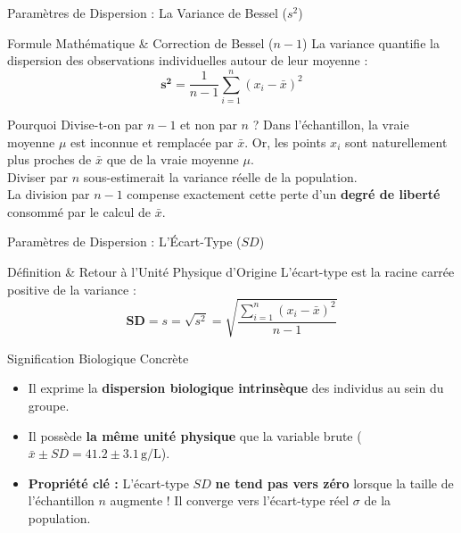 \documentclass[aspectratio=169,10pt]{beamer}
\begin{document}
\begin{frame}{Paramètres de Dispersion : La Variance de Bessel ($s^2$)}
  \begin{conceptbox}{Formule Mathématique \& Correction de Bessel ($n-1$)}
    La variance quantifie la dispersion des observations individuelles autour de leur moyenne :
    \begin{equation*}
      \mathbf{s^2} = \frac{1}{n - 1} \sum_{i=1}^n (x_i - \bar{x})^2
    \end{equation*}
  \end{conceptbox}
  \vspace{1.5mm}
  \begin{biobox}{Pourquoi Divise-t-on par $n-1$ et non par $n$ ?}
    Dans l'échantillon, la vraie moyenne $\mu$ est inconnue et remplacée par $\bar{x}$. Or, les points $x_i$ sont naturellement plus proches de $\bar{x}$ que de la vraie moyenne $\mu$.\\
    Diviser par $n$ sous-estimerait la variance réelle de la population.\\
    La division par $n-1$ compense exactement cette perte d'un \textbf{degré de liberté} consommé par le calcul de $\bar{x}$.
  \end{biobox}
\end{frame}

\begin{frame}{Paramètres de Dispersion : L'Écart-Type ($SD$)}
  \begin{conceptbox}{Définition \& Retour à l'Unité Physique d'Origine}
    L'écart-type est la racine carrée positive de la variance :
    \begin{equation*}
      \mathbf{SD} = s = \sqrt{s^2} = \sqrt{\frac{\sum_{i=1}^n (x_i - \bar{x})^2}{n - 1}}
    \end{equation*}
  \end{conceptbox}
  \vspace{1.5mm}
  \begin{biobox}{Signification Biologique Concrète}
    \begin{itemize}\setlength{\itemsep}{1.5pt}
      \item Il exprime la \textbf{dispersion biologique intrinsèque} des individus au sein du groupe.
      \item Il possède \textbf{la même unité physique} que la variable brute ($\bar{x} \pm SD = 41.2 \pm 3.1\,\text{g/L}$).
      \item \textbf{Propriété clé :} L'écart-type $SD$ \textbf{ne tend pas vers zéro} lorsque la taille de l'échantillon $n$ augmente ! Il converge vers l'écart-type réel $\sigma$ de la population.
    \end{itemize}
  \end{biobox}
\end{frame}
\end{document}
